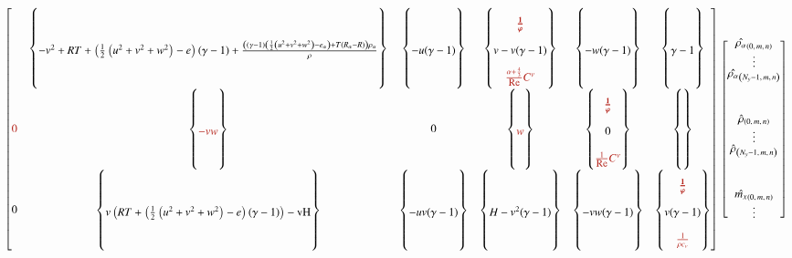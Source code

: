 \documentclass[letterpaper,11pt,nointlimits,reqno,draft]{amsart}
\begin{document}
\begin{sidewaysfigure}
{{\begin{minipage}[c]{\textwidth}
\begin{align*}
\begin{bmatrix}
& 
\entry{\my\rho }
  \subcoeff{
  }{
-v^2+R T+\left(\frac{1}{2} \left(u^2+v^2+w^2\right)-e\right) (\gamma -1)+\frac{\left((\gamma -1) \left(\frac{1}{2} \left(u^2+v^2+w^2\right)-e_{\alpha }\right)+T
   \left(R_{\alpha }-R\right)\right) \rho _{\alpha }}{\rho }
  }{
  }
& \entry{\my\mx  }
  \subcoeff{
  }{
 -u (\gamma -1) 
  }{
  }
& \entry{\my\my  }
  \subcoeff{
      \ind{\bm{\frac{1}{\vp}}} %
  }{
 v-v (\gamma -1)
  }{
      \ind{\frac{\alpha+\frac{4}{3}}{\Re}\C{\nu}{}}
  }
& \entry{\my\mz  }
  \subcoeff{
  }{
 -w (\gamma -1)
  }{
  }
& \entry{\my{}e  }
  \subcoeff{
  }{
 \gamma -1 
  }{
  }
\\\entry{\mz\rho_{\alpha} }
 \ind{0}
& 
\entry{\mz\rho}
  \subcoeff{
  }{
    \ind{-vw}
  }{
  }
& \entry{\mz\mx }
 0
& \entry{\mz\my }
  \subcoeff{
  }{
    \ind{w}
  }{
  }
& \entry{\mz\mz }
  \subcoeff{
      \ind{\bm{\frac{1}{\vp}}} %
  }{
 0 
  }{
    \ind{  \frac{1}{\Re}\C{\nu}{}}
  }
& \entry{\mz{}e }
  \subcoeff{
  }{
  }{
  }
\\\entry{e\rho_{\alpha} }
 0 
& 
\entry{e\rho  }
  \subcoeff{
  }{
 v \left(R T+\left(\frac{1}{2} \left(u^2+v^2+w^2\right)-e\right) (\gamma -1)\right)-\text{vH}
  }{
  }
& \entry{e\mx   }
  \subcoeff{
  }{
 -u v (\gamma -1)
  }{
  }
& \entry{e\my   }
  \subcoeff{
  }{
 H-v^2 (\gamma -1)
  }{
  }
& \entry{e\mz   }
  \subcoeff{
  }{
 -v w (\gamma -1)
  }{
  }
& \entry{ee     }
  \subcoeff{
      \ind{\bm{\frac{1}{\vp}}} %
  }{
 v (\gamma -1)
  }{
    \ind{\frac{1}{\rho c_v}}
  }
\end{bmatrix}
\renewcommand{\arraystretch}{0.6}
\begin{bmatrix}
  \hat{\rho_{\alpha}}_{\left(0,\,m,\,n\right)} \\
  \vdots \\
  \hat{\rho_{\alpha}}_{\left(N_y-1,\,m,\,n\right)} \\
\\%
\\%
\\%
\\%
  \hat{\rho}_{\left(0,\,m,\,n\right)} \\
  \vdots \\
  \hat{\rho}_{\left(N_y-1,\,m,\,n\right)} \\
\\%
\\%
\\%
\\%
  \hat{\mx}_{\left(0,\,m,\,n\right)} \\
  \vdots \\

\end{bmatrix}
\end{align*}
\end{minipage}}}
\end{sidewaysfigure}
\end{document}
